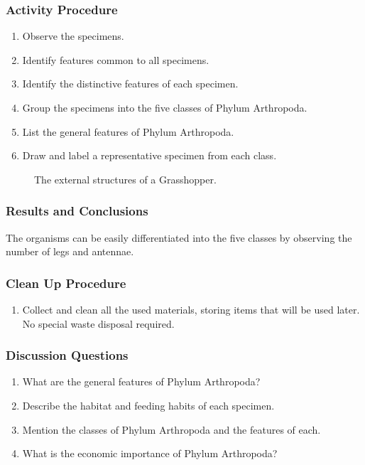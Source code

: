 \subsubsection*{Activity Procedure}
\begin{enumerate}
\item{Observe the specimens.}
\item{Identify features common to all specimens.}
\item{Identify the distinctive features of each specimen.}
\item{Group the specimens into the five classes of Phylum Arthropoda.}
\item{List the general features of Phylum Arthropoda.}
\item{Draw and label a representative specimen from each class.}
\end{enumerate}

\begin{figure}[h]
\begin{center}
\def\svgwidth{12cm}

\caption{The external structures of a Grasshopper.}
\label{fig:fish}
\end{center}
\end{figure}

\subsubsection*{Results and Conclusions}
The organisms can be easily differentiated into the five classes by observing the number of legs and antennae. 

\subsubsection*{Clean Up Procedure}
\begin{enumerate}
\item{Collect and clean all the used materials, storing items that will be used later. No special waste disposal required.}
\end{enumerate}

\subsubsection*{Discussion Questions}
\begin{enumerate}
\item{What are the general features of Phylum Arthropoda?}
\item{Describe the habitat and feeding habits of each specimen.}
\item{Mention the classes of Phylum Arthropoda and the features of each.}
\item{What is the economic importance of Phylum Arthropoda?}
\end{enumerate}


